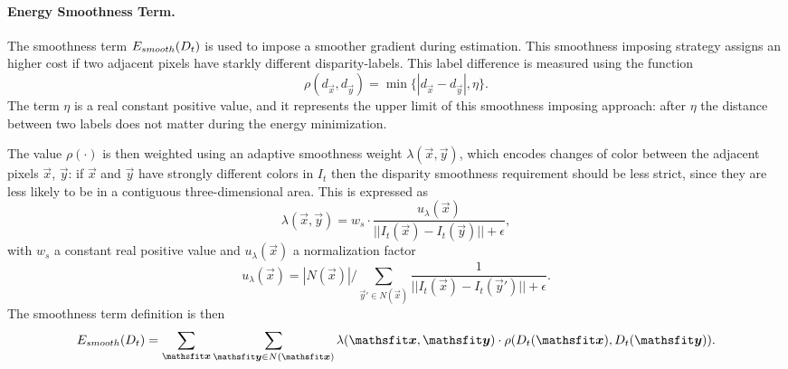 \paragraph{Energy Smoothness Term.}
The smoothness term $\mathop{E_{smooth}}(D_t)$ is used to impose a smoother gradient during estimation.
This smoothness imposing strategy assigns an higher cost if two adjacent pixels have starkly different disparity-labels.
This label difference is measured using the function
$$\rho(d_{\vec x}, d_{\vec y}) = \min\{|d_{\vec x}-d_{\vec y}|, \eta\}.$$
The term $\eta$ is a real constant positive value, and it represents the upper limit of this smoothness imposing approach: after $\eta$ the distance between two labels does not matter during the energy minimization.

The value $\rho(\cdot)$ is then weighted using an adaptive smoothness weight $\lambda(\vec x, \vec y)$, which encodes changes of color between the adjacent pixels $\vec x$, $\vec y$: if $\vec x$ and $\vec y$ have strongly different colors in $I_t$ then the disparity smoothness requirement should be less strict, since they are less likely to be in a contiguous three-dimensional area. This is expressed as 
$$\lambda(\vec x,\vec y) = w_s\cdot \frac{u_\lambda(\vec x)}{|| I_t(\vec x) - I_t(\vec y)|| + \epsilon},$$
with $w_s$ a constant real positive value and $u_{\lambda}(\vec x)$ a normalization factor
$$
	u_{\lambda}(\vec x) = {|N(\vec x)|}\big/{\sum_{\vec y'\in N(\vec x)} \frac{1}{||I_t(\vec x) - I_t(\vec y')||+\epsilon}}.
$$
The smoothness term definition is then
\begin{equation}
	\ContinuityCost(D_t) = \sum_{\vec x} \sum_{\vec y\in N(\vec x)} \lambda(\vec x,\vec y)\cdot \rho(D_t(\vec x),D_t(\vec y)).
\end{equation}


